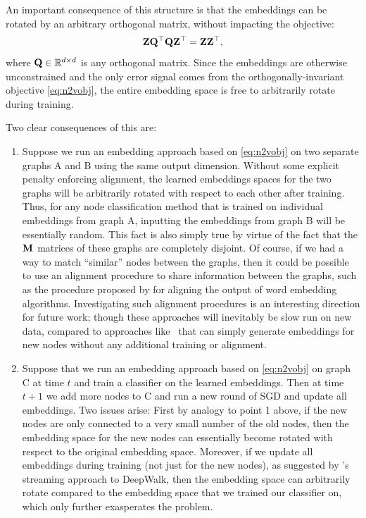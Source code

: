 An important consequence of this structure is that the embeddings can be rotated by an arbitrary orthogonal matrix, without impacting the objective:
\begin{equation}
\mathbf{Z}\mathbf{Q}^\top\mathbf{Q}\mathbf{Z}^\top = \mathbf{Z}\mathbf{Z}^\top,
\end{equation}
where $\mathbf{Q} \in \mathbb{R}^{d\times d}$ is any orthogonal matrix. 
Since the embeddings are otherwise unconstrained and the only error signal comes from the orthogonally-invariant objective \eqref{eq:n2vobj}, the entire embedding space is free to arbitrarily rotate during training.  

Two clear consequences of this are:
\begin{enumerate}
\item
	Suppose we run an embedding approach based on \eqref{eq:n2vobj} on two separate graphs A and B using the same output dimension. Without some explicit penalty enforcing alignment, the learned embeddings spaces for the two graphs will be arbitrarily rotated with respect to each other after training. 
	Thus, for any node classification method that is trained on individual embeddings from graph A, inputting the embeddings from graph B will be essentially random. 
	This fact is also simply true by virtue of the fact that the $\mathbf{M}$ matrices of these graphs are completely disjoint. 
	Of course, if we had a way to match ``similar'' nodes between the graphs, then it could be possible to use an alignment procedure to share information between the graphs, such as the procedure proposed by \cite{hamilton2016diachronic} for aligning the output of word embedding algorithms. 
	Investigating such alignment procedures is an interesting direction for future work; though these approaches will inevitably be slow run on new data, compared to approaches like \name\ that can simply generate embeddings for new nodes without any additional training or alignment. 
\item
  Suppose that we run an embedding approach based on \eqref{eq:n2vobj} on graph C at time $t$ and train a classifier on the learned embeddings. Then at time $t+1$ we add more nodes to C and run a new round of SGD and update all embeddings.
  Two issues arise: First by analogy to point 1 above, if the new nodes are only connected to a very small number of the old nodes, then the embedding space for the new nodes can essentially become rotated with respect to the original embedding space.
  Moreover, if we update all embeddings during training (not just for the new nodes), as suggested by \cite{perozzi2014deepwalk}'s streaming approach to DeepWalk, then the embedding space can arbitrarily rotate compared to the embedding space that we trained our classifier on, which only further exasperates the problem.  
\end{enumerate}

